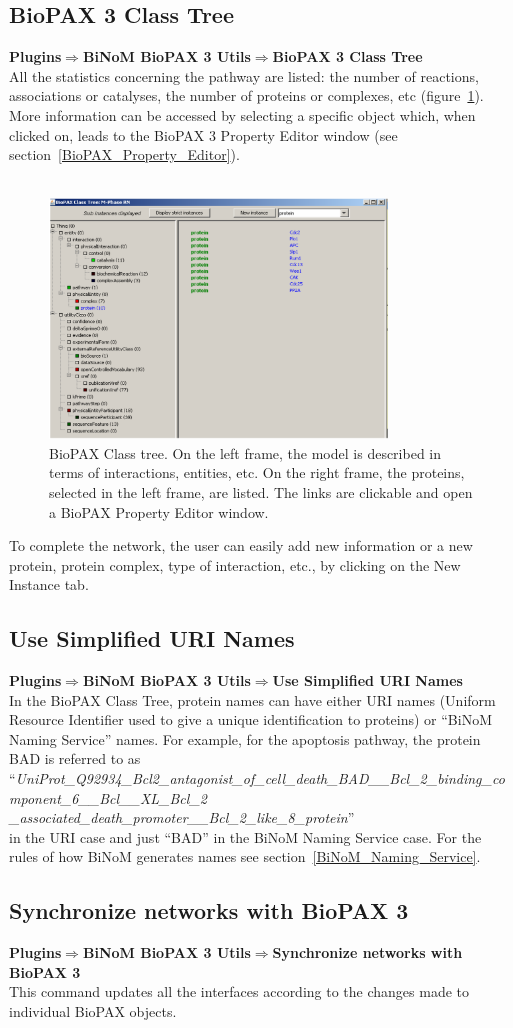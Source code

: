 \subsection{BioPAX 3 Class Tree}
\textbf{Plugins$\Rightarrow$BiNoM BioPAX 3 Utils$\Rightarrow$BioPAX 3 Class Tree}\\
All the statistics concerning the pathway are listed: the number of reactions, associations or catalyses, the number of proteins or complexes, etc (figure~\ref{BioPAX_Class_Tree}). More information can be accessed by selecting a specific object which, when clicked on, leads to the BioPAX 3 Property Editor window (see section~\ref{BioPAX_Property_Editor}).\\\\
\begin{figure}[h]
\centering
\includegraphics[width=0.8\textwidth]{graphics/BioPAX_Class_Tree}
\caption{BioPAX Class tree. On the left frame, the model is described in terms of interactions, entities, etc. On the right frame, the proteins, selected in the left frame, are listed. The links are clickable and open a BioPAX Property Editor window.}
\label{BioPAX_Class_Tree}
\end{figure}
To complete the network, the user can easily add new information or a new protein, protein complex, type of interaction, etc., by clicking on the New Instance tab.

\subsection{Use Simplified URI Names}
\textbf{Plugins$\Rightarrow$BiNoM BioPAX 3 Utils$\Rightarrow$Use Simplified URI Names}\\
In the BioPAX Class Tree, protein names can have either URI names (Uniform Resource Identifier used to give a unique identification to proteins) or “BiNoM Naming Service” names. For example, for the apoptosis pathway, the protein BAD is referred to as\\
“\textit{UniProt\_Q92934\_Bcl2\_antagonist\_of\_cell\_death\_BAD\_\_Bcl\_2\_binding\_component\_6\_\_Bcl\_\_XL\_Bcl\_2\\
\_associated\_death\_promoter\_\_Bcl\_2\_like\_8\_protein}”\\
in the URI case and just “BAD” in the BiNoM Naming Service case. For the rules of how BiNoM generates names see section~\ref{BiNoM_Naming_Service}.

\subsection{Synchronize networks with BioPAX 3}
\textbf{Plugins$\Rightarrow$BiNoM BioPAX 3 Utils$\Rightarrow$Synchronize networks with BioPAX 3}\\
This command updates all the interfaces according to the changes made to individual BioPAX objects.